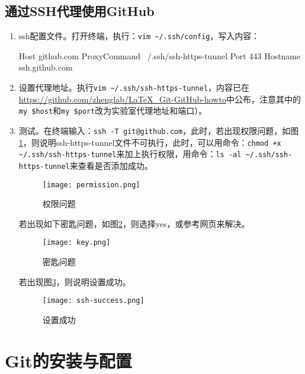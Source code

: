 \documentclass[a4paper,12pt]{article}
\begin{document}
\subsection{通过SSH代理使用GitHub}

\begin{enumerate}
\item ssh配置文件。打开终端，执行：\lstinline|vim ~/.ssh/config|，写入内容：
\begin{plaintext}
Host github.com
ProxyCommand ~/.ssh/ssh-https-tunnel %
Port 443
Hostname ssh.github.com
\end{plaintext}
\item 设置代理地址。执行\lstinline|vim ~/.ssh/ssh-https-tunnel|，内容已在\url{https://github.com/zhenglab/LaTeX\_Git-GitHub-howto}中公布，注意其中的\verb|my $host|和\verb|my $port|改为实验室代理地址和端口）。
\item 测试。在终端输入：\lstinline|ssh -T git@github.com|，此时，若出现权限问题，如图\ref{fig:3}，则说明ssh-https-tunnel文件不可执行，此时，可以用命令：\lstinline|chmod +x ~/.ssh/ssh-https-tunnel|来加上执行权限，用命令：\lstinline|ls -al ~/.ssh/ssh-https-tunnel|来查看是否添加成功。
\begin{figure}[!htb] %
\centering
\texttt{[image: permission.png]}
\caption{权限问题}\label{fig:3}
\end{figure}

若出现如下密匙问题，如图\ref{fig:4}，则选择yes，或参考网页\cite{2:misc}来解决。
\begin{figure}[!htb] %
\texttt{[image: key.png]}
\centering\caption{密匙问题}\label{fig:4}
\end{figure}

若出现图\ref{fig:5}，则说明设置成功。
\begin{figure}[!htb] %
\texttt{[image: ssh-success.png]}
\centering\caption{设置成功}\label{fig:5}
\end{figure}
\end{enumerate}

\section{Git的安装与配置}
\end{document}
